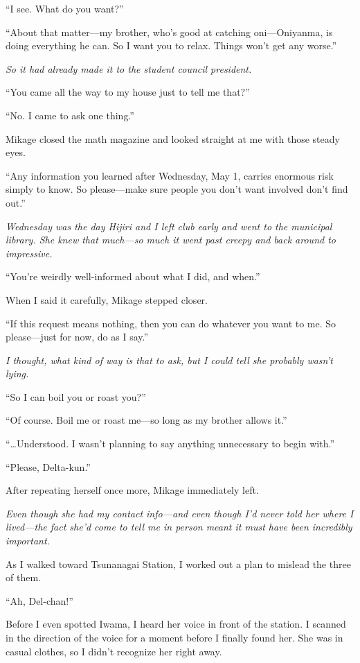 \documentclass[
    a4paper,
    12pt,
    twoside,
    openany,
    UTF8,
    fontset=windows
]{ctexbook}
\begin{document}
``I see. What do you want?''

``About that matter---my brother, who's good at catching oni---Oniyanma, is doing everything he can. So I want you to relax. Things won't get any worse.''

\textit{So it had already made it to the student council president.}

``You came all the way to my house just to tell me that?''

``No. I came to ask one thing.''

Mikage closed the math magazine and looked straight at me with those steady eyes.

``Any information you learned after Wednesday, May 1, carries enormous risk simply to know. So please---make sure people you don't want involved don't find out.''

\textit{Wednesday was the day Hijiri and I left club early and went to the municipal library. She knew that much---so much it went past creepy and back around to impressive.}

``You're weirdly well-informed about what I did, and when.''

When I said it carefully, Mikage stepped closer.

``If this request means nothing, then you can do whatever you want to me. So please---just for now, do as I say.''

\textit{I thought, what kind of way is that to ask, but I could tell she probably wasn't lying.}

``So I can boil you or roast you?''

``Of course. Boil me or roast me---so long as my brother allows it.''

``\dots Understood. I wasn't planning to say anything unnecessary to begin with.''

``Please, Delta-kun.''

After repeating herself once more, Mikage immediately left.

\textit{Even though she had my contact info---and even though I'd never told her where I lived---the fact she'd come to tell me in person meant it must have been incredibly important.}

As I walked toward Tsunanagai Station, I worked out a plan to mislead the three of them.

``Ah, Del-chan!''

Before I even spotted Iwama, I heard her voice in front of the station. I scanned in the direction of the voice for a moment before I finally found her. She was in casual clothes, so I didn't recognize her right away.
\end{document}
